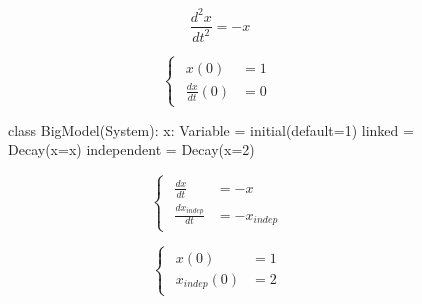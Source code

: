 \documentclass[namedate,numsec,webpdf,modern,large]{oup-authoring-template}
\theoremstyle{thmstyleone}%
\theoremstyle{thmstyletwo}%
\theoremstyle{thmstylethree}%
\newenvironment{CodeInput}{\begin{tcolorbox}[title=input,boxrule=0pt]}{\end{tcolorbox}}
\newcommand{\KeywordTok}[1]{\textcolor[rgb]{0.00,0.13,1.00}{#1}}
\newcommand{\ClassTok}[1]{\textcolor[rgb]{0.27,0.56,0.65}{#1}}
\newcommand{\OperatorTok}[1]{\textcolor[rgb]{0.00,0.00,0.00}{#1}}
\newcommand{\VariableTok}[1]{\textcolor[rgb]{0.00,0.06,0.50}{#1}}
\newcommand{\ValueTok}[1]{\textcolor[rgb]{0.13,0.57,0.41}{#1}}
\newcommand{\FunctionTok}[1]{\textcolor[rgb]{0.47,0.37,0.15}{#1}}
\begin{document}
\begin{figure}[t]
\begin{minipage}[t]{\columnwidth}
\begin{minipage}[c]{\columnwidth}
  \end{minipage}%
  \newline
  \begin{minipage}[c]{0.5\columnwidth}
  \[ \frac{d^2x}{dt^2} = -x \]
  \end{minipage}%
  \begin{minipage}[c]{0.5\columnwidth}
  \[
  \begin{cases}
    \begin{aligned}
      x(0) &= 1 \\
      \frac{dx}{dt}(0) &= 0
    \end{aligned}
  \end{cases}
  \]
  \end{minipage}%
  
  \end{minipage}%
  \newline
  \begin{minipage}[t]{\columnwidth}
  \begin{minipage}[c]{\columnwidth}
  \begin{CodeInput}
\begin{Highlighting}[]
\KeywordTok{class} \ClassTok{BigModel}\KeywordTok{(}\ClassTok{System}\KeywordTok{)}:
  \VariableTok{x}: \ClassTok{Variable} \OperatorTok{=} \FunctionTok{initial}\KeywordTok{(\VariableTok{default}\OperatorTok{=}\ValueTok{1})}
  \VariableTok{linked} \OperatorTok{=} \ClassTok{Decay}\KeywordTok{(\VariableTok{x}\OperatorTok{=}\VariableTok{x})}
  \VariableTok{independent} \OperatorTok{=} \ClassTok{Decay}\KeywordTok{(\VariableTok{x}\OperatorTok{=}\ValueTok{2})}
\end{Highlighting}
  \end{CodeInput}
  \end{minipage}%
  \newline
  \begin{minipage}[c]{0.5\columnwidth}
  \[
  \begin{cases}
    \begin{aligned}
      \frac{dx}{dt} &= -x \\
      \frac{dx_{indep}}{dt} &= -x_{indep}
    \end{aligned}
  \end{cases}
  \]
\end{minipage}%
\begin{minipage}[c]{0.5\columnwidth}
  \[
  \begin{cases}
    \begin{aligned}
      x(0) &= 1 \\
      x_{indep}(0) &= 2
    \end{aligned}
  \end{cases}
  \]
  \end{minipage}%
  

\end{minipage}
\end{figure}
\end{document}
